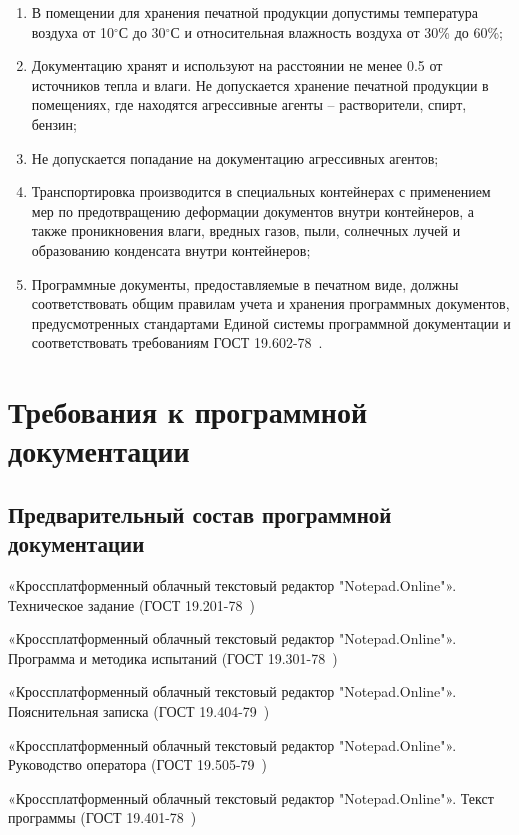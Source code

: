 ﻿\documentclass[techtask]{espd}
\begin{document}
\begin{enumerate}
\item В помещении для хранения печатной продукции допустимы температура воздуха от 10$^\circ$С до 30$^\circ$С и относительная влажность воздуха от 30\% до 60\%;
\item Документацию хранят и используют на расстоянии не менее 0.5 от источников тепла и влаги. Не допускается хранение печатной продукции в помещениях, где находятся агрессивные агенты – растворители, спирт, бензин;
\item Не допускается попадание на документацию агрессивных агентов;
\item Транспортировка производится в специальных контейнерах с применением мер по предотвращению деформации документов внутри контейнеров, а также проникновения влаги, вредных газов, пыли, солнечных лучей и образованию конденсата внутри контейнеров;
\item Программные документы, предоставляемые в печатном виде, должны соответствовать общим правилам учета и хранения программных документов, предусмотренных стандартами Единой системы программной документации и соответствовать требованиям ГОСТ 19.602-78~\cite{espd602}.
\end{enumerate}

\section{Требования к программной документации}

\subsection{Предварительный состав программной документации}\label{subsection:documentation}
«Кроссплатформенный облачный текстовый редактор "Notepad.Online"». Техническое задание (ГОСТ 19.201-78~\cite{espd201})

«Кроссплатформенный облачный текстовый редактор "Notepad.Online"». Программа и методика испытаний (ГОСТ 19.301-78~\cite{espd301})

«Кроссплатформенный облачный текстовый редактор "Notepad.Online"». Пояснительная записка (ГОСТ 19.404-79~\cite{espd404})

«Кроссплатформенный облачный текстовый редактор "Notepad.Online"». Руководство оператора (ГОСТ 19.505-79~\cite{espd505})

«Кроссплатформенный облачный текстовый редактор "Notepad.Online"». Текст программы (ГОСТ 19.401-78~\cite{espd401})
\end{document}
